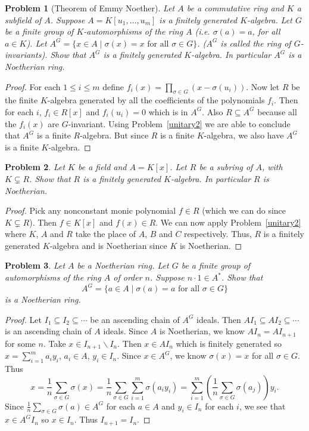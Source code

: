 \documentclass{article}
\newtheorem{problem}{Problem}
\begin{document}
\begin{problem}[Theorem of Emmy Noether]
Let $A$ be a commutative ring and $K$ a subfield of $A$. Suppose $A = K[u_1, \dots , u_m]$ is a finitely generated $K$-algebra. Let $G$ be a finite group of $K$-automorphisms of the ring $A$ (i.e. $\sigma(a) = a$, for all $a \in K$). Let $A^G = \{x \in A \mid \sigma(x) = x \text{ for all } \sigma \in G\}$. ($A^G$ is called the \emph{ring of $G$-invariants}). Show that $A^G$ is a finitely generated $K$-algebra. In particular $A^G$ is a Noetherian ring.
\end{problem}
\begin{proof}
For each $1 \leq i \leq m$ define $f_i(x) = \prod_{\sigma \in G} (x-\sigma(u_i))$. Now let $R$ be the finite $K$-algebra generated by all the coefficients of the polynomials $f_i$. Then for each $i$, $f_i \in R[x]$ and $f_i(u_i) = 0$ which is in $A^G$. Also $R \subseteq A^G$ because all the $f_i(x)$ are $G$-invariant. Using Problem~\ref{unitary2} we are able to conclude that $A^G$ is a finite $R$-algebra. But since $R$ is a finite $K$-algebra, we also have $A^G$ is a finite $K$-algebra.
\end{proof}

\begin{problem}
Let $K$ be a field and $A = K[x]$. Let $R$ be a subring of $A$, with $K \subsetneq R$. Show that $R$ is a finitely generated $K$-algebra. In particular $R$ is Noetherian.
\end{problem}
\begin{proof}
Pick any nonconstant monic polynomial $f \in R$ (which we can do since $K \subsetneq R$). Then $f \in K[x]$ and $f(x) \in R$. We can now apply Problem~\ref{unitary2} where $K$, $A$ and $R$ take the place of $A$, $B$ and $C$ respectively. Thus, $R$ is a finitely generated $K$-algebra and is Noetherian since $K$ is Noetherian.
\end{proof}

\begin{problem}
Let $A$ be a Noetherian ring. Let $G$ be a finite group of automorphisms of the ring $A$ of order $n$. Suppose $n \cdot 1 \in A^*$. Show that
\[
A^G = \{a \in A \mid \sigma(a) = a \text{ for all } \sigma \in G\}
\]
is a Noetherian ring.
\end{problem}
\begin{proof}
Let $I_1 \subseteq I_2 \subseteq \cdots$ be an ascending chain of $A^G$ ideals. Then $AI_1 \subseteq AI_2 \subseteq \cdots$ is an ascending chain of $A$ ideals. Since $A$ is Noetherian, we know $AI_n = AI_{n+1}$ for some $n$. Take $x \in I_{n+1} \backslash I_n$. Then $x \in AI_n$ which is finitely generated so $x = \sum_{i=1}^m a_i y_i$, $a_i \in A$, $y_i \in I_n$. Since $x \in A^G$, we know $\sigma(x) = x$ for all $\sigma \in G$. Thus
\[
x = \frac{1}{n}\sum_{\sigma \in G} \sigma(x) = \frac{1}{n} \sum_{\sigma \in G} \sum_{i=1}^m \sigma(a_i y_i) = \sum_{i=1}^m \left ( \frac{1}{n} \sum_{\sigma \in G} \sigma(a_j) \right ) y_i.
\]
Since $\frac{1}{n} \sum_{\sigma \in G} \sigma(a) \in A^G$ for each $a \in A$ and $y_i \in I_n$ for each $i$, we see that $x \in A^GI_n$ so $x \in I_n$. Thus $I_{n+1} = I_n$.
\end{proof}
\end{document}
